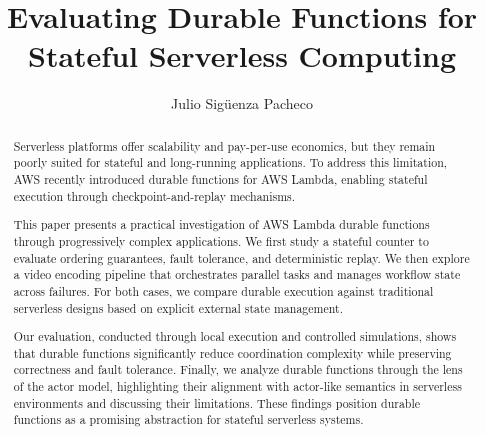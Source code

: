\documentclass[sigconf]{acmart}
\title{Evaluating Durable Functions for Stateful Serverless Computing}
\author{Julio Sigüenza Pacheco}
\begin{document}
\begin{abstract}
Serverless platforms offer scalability and pay-per-use economics, but they remain poorly suited for stateful and long-running applications. To address this limitation, AWS recently introduced durable functions for AWS Lambda, enabling stateful execution through checkpoint-and-replay mechanisms.

This paper presents a practical investigation of AWS Lambda durable functions through progressively complex applications. We first study a stateful counter to evaluate ordering guarantees, fault tolerance, and deterministic replay. We then explore a video encoding pipeline that orchestrates parallel tasks and manages workflow state across failures. For both cases, we compare durable execution against traditional serverless designs based on explicit external state management.

Our evaluation, conducted through local execution and controlled simulations, shows that durable functions significantly reduce coordination complexity while preserving correctness and fault tolerance. Finally, we analyze durable functions through the lens of the actor model, highlighting their alignment with actor-like semantics in serverless environments and discussing their limitations. These findings position durable functions as a promising abstraction for stateful serverless systems.
\end{abstract}

\maketitle










\end{document}
